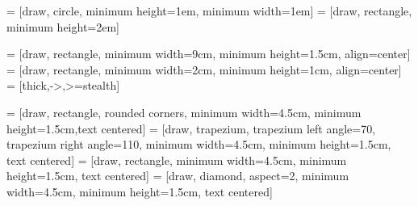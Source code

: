 




\usepackage{amsmath,amsfonts,amssymb,amsthm}

\usepackage{booktabs}
\usepackage{graphicx}

\usepackage[justification=centering]{caption}

\usepackage{calc}

\usepackage{tikz}
\usetikzlibrary{positioning}
\usetikzlibrary{calc}

 = [draw, circle, minimum height=1em, minimum width=1em]
 = [draw, rectangle, minimum height=2em]

\usetikzlibrary{shapes.geometric, arrows}
\usetikzlibrary{fit}

 = [draw, rectangle, minimum width=9cm, minimum height=1.5cm, align=center]
 = [draw, rectangle, minimum width=2cm, minimum height=1cm, align=center]
 = [thick,->,>=stealth]

 = [draw, rectangle, rounded corners, minimum width=4.5cm, minimum height=1.5cm,text centered]
 = [draw, trapezium, trapezium left angle=70, trapezium right angle=110, minimum width=4.5cm, minimum height=1.5cm, text centered]
 = [draw, rectangle, minimum width=4.5cm, minimum height=1.5cm, text centered]
 = [draw, diamond, aspect=2, minimum width=4.5cm, minimum height=1.5cm, text centered]


\newcommand{\troom}{\ensuremath{\hat{T}_{\mathrm{off}}}}
\newcommand{\hroom}{\ensuremath{\hat{h}_{\mathrm{off}}}}
\newcommand{\xa}{\ensuremath{\hat{x}_a}}

\newcommand{\irr}{\ensuremath{I}}
\newcommand{\irrnat}{\ensuremath{\hat{\irr}_{\mathrm{nat}}}}
\newcommand{\irrart}{\ensuremath{\irr_{\mathrm{art}}}}
\newcommand{\pho}{\ensuremath{A}}
\newcommand{\pow}{\ensuremath{P}}

\newcommand{\irrdelta}{\ensuremath{\irr_{\Delta}}}

\newcommand{\maxirrart}{\ensuremath{\irrart^{\max}}}
\newcommand{\maxpow}{\ensuremath{\pow^{\max}}}

\newcommand{\accirr}{\ensuremath{\irr_{\Sigma}}}
\newcommand{\accpho}{\ensuremath{\pho_{\Sigma}}}
\newcommand{\accpow}{\ensuremath{\pow_{\Sigma}}}

\newcommand{\optaccirr}{\ensuremath{\accirr^{\mathrm{opt}}}}
\newcommand{\maxaccpho}{\ensuremath{\accpho^{\max}}}
\newcommand{\minaccpho}{\ensuremath{\accpho^{\min}}}
\newcommand{\maxaccpow}{\ensuremath{\accpow^{\max}}}